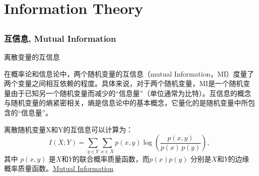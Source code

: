 \chapter{Information Theory}
\section{}
\subsection{互信息, Mutual Information}
离散变量的互信息

在概率论和信息论中，两个随机变量的互信息（mutual Information，MI）度量了两个变量之间相互依赖的程度。具体来说，对于两个随机变量，MI是一个随机变量由于已知另一个随机变量而减少的“信息量”（单位通常为比特）。互信息的概念与随机变量的熵紧密相关，熵是信息论中的基本概念，它量化的是随机变量中所包含的“信息量”。

离散随机变量X和Y的互信息可以计算为：
\begin{equation}
    I(X;Y)=\sum _{{y\in Y}}\sum _{{x\in X}}p(x,y)\log {\left({\frac  {p(x,y)}{p(x)\,p(y)}}\right)},
\end{equation}
其中 $p(x, y)$ 是$X$和$Y$的联合概率质量函数，而$p(x)$$p(y)$ 分别是$X$和$Y$的边缘概率质量函数。\href{https://en.wikipedia.org/wiki/Mutual_information}{Mutual Information}